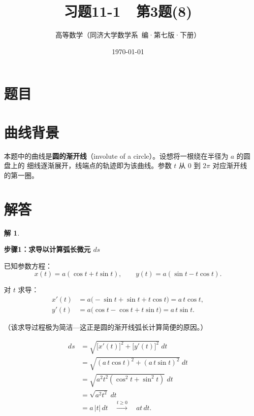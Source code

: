 \documentclass[12pt,a4paper]{ctexart}
\title{\Huge\bfseries 习题11-1~~第3题(8)}
\author{高等数学（同济大学数学系~编·第七版·下册）}
\date{\today}
\theoremstyle{myremark}
\newtheorem*{remark}{解}
\begin{document}
\maketitle
\thispagestyle{fancy}

\section*{题目}
\bigskip

\section*{曲线背景}

本题中的曲线是\textbf{圆的渐开线}（involute of a circle）。设想将一根绕在半径为 $a$ 的圆盘上的
细线逐渐展开，线端点的轨迹即为该曲线。参数 $t$ 从 $0$ 到 $2\pi$ 对应渐开线的第一圈。

\section*{解答}

\begin{remark}
  ~
\end{remark}

\medskip

\noindent\textbf{步骤1：求导以计算弧长微元 $ds$}

已知参数方程：
\[
x(t) = a(\cos t + t\sin t),\qquad
y(t) = a(\sin t - t\cos t).
\]

对 $t$ 求导：
\[
\begin{aligned}
x'(t) &= a\bigl(-\sin t + \sin t + t\cos t\bigr) = a\, t\cos t,\\[4pt]
y'(t) &= a\bigl(\cos t - \cos t + t\sin t\bigr) = a\, t\sin t.
\end{aligned}
\]

（该求导过程极为简洁---这正是圆的渐开线弧长计算简便的原因。）

\[
\begin{aligned}
ds &= \sqrt{\bigl[x'(t)\bigr]^2 + \bigl[y'(t)\bigr]^2}\; dt \\[4pt]
   &= \sqrt{(a\,t\cos t)^2 + (a\,t\sin t)^2}\; dt \\[4pt]
   &= \sqrt{a^2 t^2 (\cos^2 t + \sin^2 t)}\; dt \\[4pt]
   &= \sqrt{a^2 t^2}\; dt \\[4pt]
   &= a\,|t|\, dt \quad \xrightarrow{t \geq 0}\quad a t\, dt.
\end{aligned}
\]
\end{document}
